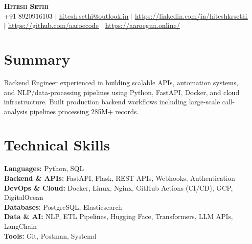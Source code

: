 \documentclass[letterpaper,11pt]{article}
\begin{document}

\begin{center}
    \textbf{\Huge \scshape Hitesh Sethi} \\ \vspace{1pt}
    \small +91 8920916103 $|$ \href{mailto:aaroecode@gmail.com}{\underline{hitesh.sethi@outlook.in}} $|$ 
    \href{https://www.linkedin.com/in/hiteshkrsethi/}{\underline{https://linkedin.com/in/hiteshkrsethi}} $|$
    \href{https://github.com/aaroecode}{\underline{https://github.com/aaroecode}} $|$
    \href{https://aaroegun.online/}{\underline{https://aaroegun.online/}}
\end{center}

\section{Summary}
    {Backend Engineer experienced in building scalable APIs, automation systems, and NLP/data-processing pipelines using Python, FastAPI, Docker, and cloud infrastructure. Built production backend workflows including large-scale call-analysis pipelines processing 285M+ records.}
    

%
\section{Technical Skills}
 \begin{itemize}[leftmargin=0.15in, label={}]
    \small{\item{
     \textbf{Languages:}{ Python, SQL} \\
     \textbf{Backend \& APIs:}{ FastAPI, Flask, REST APIs, Webhooks, Authentication} \\
     \textbf{DevOps \& Cloud:}{ Docker, Linux, Nginx, GitHub Actions (CI/CD), GCP, DigitalOcean} \\
     \textbf{Databases:}{ PostgreSQL, Elasticsearch} \\
     \textbf{Data \& AI:}{ NLP, ETL Pipelines, Hugging Face, Transformers, LLM APIs, LangChain} \\
     \textbf{Tools:}{ Git, Postman, Systemd} \\
    }}
  \end{itemize}
\end{document}
